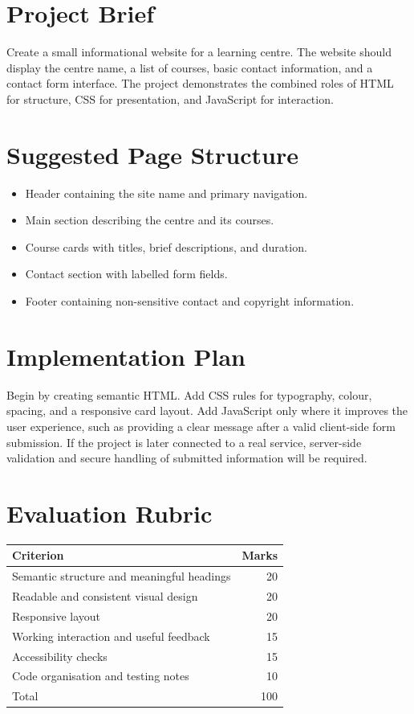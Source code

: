 \documentclass[11pt,openany,oneside]{book}
\begin{document}
\section{Project Brief}
Create a small informational website for a learning centre. The website should display the centre name, a list of courses, basic contact information, and a contact form interface. The project demonstrates the combined roles of HTML for structure, CSS for presentation, and JavaScript for interaction.

\section{Suggested Page Structure}
\begin{itemize}
\item Header containing the site name and primary navigation.
\item Main section describing the centre and its courses.
\item Course cards with titles, brief descriptions, and duration.
\item Contact section with labelled form fields.
\item Footer containing non-sensitive contact and copyright information.
\end{itemize}

\section{Implementation Plan}
Begin by creating semantic HTML. Add CSS rules for typography, colour, spacing, and a responsive card layout. Add JavaScript only where it improves the user experience, such as providing a clear message after a valid client-side form submission. If the project is later connected to a real service, server-side validation and secure handling of submitted information will be required.

\section{Evaluation Rubric}
\begin{tabularx}{\textwidth}{p{}r}
\toprule
Criterion & Marks\\
\midrule
Semantic structure and meaningful headings & 20\\
Readable and consistent visual design & 20\\
Responsive layout & 20\\
Working interaction and useful feedback & 15\\
Accessibility checks & 15\\
Code organisation and testing notes & 10\\
\midrule
Total & 100\\
\bottomrule
\end{tabularx}
\end{document}
